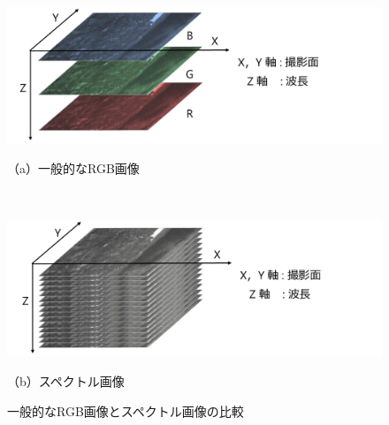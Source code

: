 
\begin{figure}[p]
	\begin{center}


		\begin{minipage}[b]{\linewidth}
		\centering
		\includegraphics[width=12.5cm]{./Ch2_PrinciplesOfMethod/Fig/RGBimage_compressed.pdf}
		\vspace{-2mm}
		\caption*{（a）一般的なRGB画像} 
		\vspace{1cm} %
		\end{minipage}\\

		\begin{minipage}[b]{\linewidth}
		\centering
		\includegraphics[width=12.5cm]{./Ch2_PrinciplesOfMethod/Fig/spectralimage_compressed.pdf}
		\vspace{-2mm}
		\caption*{（b）スペクトル画像} 
		\end{minipage}
	
	\caption{一般的なRGB画像とスペクトル画像の比較}\label{fig:RGBimage_spectralimage_comparison}
	\end{center}
\end{figure}

